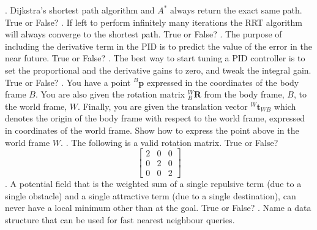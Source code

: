 \documentclass[a4paper,10pt]{article}
\begin{document}
\newline
{}. Dijkstra's shortest path algorithm and $A^*$ always return the exact same path. True or False? 
\newline
{}. If left to perform infinitely many iterations the RRT algorithm will always converge to the shortest path. True or False? 
\newline
{}. The purpose of including the derivative term in the PID is to predict the value of the error in the near future. True or False?
\newline
{}. The best way to start tuning a PID controller is to set the proportional and the derivative gains to zero, and tweak the integral gain. True or False?
\newline
{}. You have a point ${}^B\textbf{p}$ expressed in the coordinates of the body frame $B$. You are also given the rotation matrix ${}^W_B\textbf{R}$ from the body frame, $B$,
to the world frame, $W$. Finally, you are given the translation vector ${}^W\textbf{t}_{WB}$ which denotes the origin of the body frame with respect to the world frame, 
expressed in coordinates of the world frame. Show how to express the point above in the world frame $W$.
\newline
\newline
{}. The following is a valid rotation matrix. True or False? \begin{equation}
 \begin{bmatrix}
      2 & 0 & 0 \\
      0 & 2 & 0 \\
      0 & 0 & 2
 \end{bmatrix} \nonumber
\end{equation}
\newline
{}. A potential field that is the weighted sum of a single repulsive term (due to a single obstacle) and a single attractive term (due to a single destination),
can never have a local minimum other than at the goal. True or False?
\newline
{}. Name a data structure that can be used for fast nearest neighbour queries.
\newline
\newline
\end{document}
